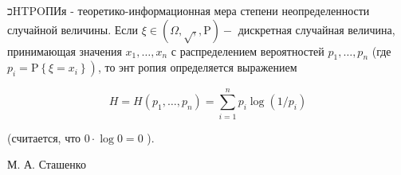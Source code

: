 \documentclass[10pt]{article}
\begin{document}
כHTPOПИя - теоретико-информационная мера степени неопределенности случайной величины. Если $\xi \in(\Omega, \sqrt{,}, \mathrm{P})-$ дискретная случайная величина, принимающая значения $x_{1}, \ldots, x_{n}$ с распределением вероятностей $p_{1}, \ldots, p_{n}$ (где $\left.p_{i}=\mathrm{P}\left\{\xi=x_{i}\right\}\right)$, то энт ропия определяется выражением



\[

H=H\left(p_{1}, \ldots, p_{n}\right)=\sum_{i=1}^{n} p_{i} \log \left(1 / p_{i}\right)

\]



(считается, что $0 \cdot \log 0=0$ ).



М. А. Сташенко
\end{document}
